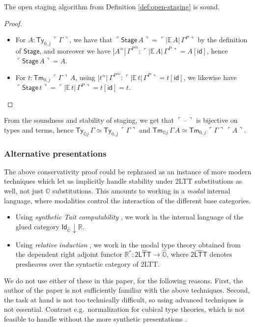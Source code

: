 \documentclass[acmsmall,review]{acmart}
\newcommand{\msf}[1]{\mathsf{#1}}
\newcommand{\mbb}[1]{\mathbb{#1}}
\newcommand{\wh}[1]{\widehat{#1}}
\newcommand{\mbbo}{\mbb{O}}
\newcommand{\Ty}{\msf{Ty}}
\newcommand{\Tm}{\msf{Tm}}
\newcommand{\id}{\msf{id}}
\newcommand{\blank}{{\mathord{\hspace{1pt}\text{--}\hspace{1pt}}}}
\newcommand{\emb}[1]{\ulcorner#1\urcorner}
\newcommand{\Stage}{\msf{Stage}}
\newcommand{\hato}{\bm\hat{\mbbo}}
\newcommand{\ev}{\mbb{E}}
\newcommand{\re}{\mbb{R}}
\theoremstyle{remark}
\newcommand{\rel}{^{\approx}}
\begin{document}
\begin{theorem}
The open staging algorithm from Definition \ref{def:open-staging} is sound.
\end{theorem}
\begin{proof}
\mbox{}
\begin{itemize}
\item For $A : \Ty_{0,j}\,\emb{\Gamma}$, we have that $\emb{\Stage\,A} =
\emb{|\ev\,A|\,\Gamma^P}$ by the definition of $\Stage$, and moreover we have
$|A\rel|\,{\Gamma^P}\rel : \emb{|\ev\,A|\,\Gamma^P} = A[\id]$, hence $\emb{\Stage\,A} = A$.

\item For $t : \Tm_{0,j}\,\emb{\Gamma}\,A$, using $|t\rel|\,{\Gamma^P}\rel : \emb{|\ev\,t|\,\Gamma^P} = t[\id]$, we likewise
  have $\emb{\Stage\,t} = \emb{|\ev\,t|\,\Gamma^P} = t[\id] = t$.
\end{itemize}
\end{proof}

\begin{corollary}\label{conservativity}
From the soundness and stability of staging, we get that $\emb{\blank}$ is
bijective on types and terms, hence $\Ty_{\mbbo j}\,\Gamma \simeq \Ty_{0,j}\,\emb{\Gamma}$ and
$\Tm_{\mbbo j}\,\Gamma\,A \simeq \Tm_{0,j}\,\emb{\Gamma}\,\emb{A}$.
\end{corollary}

\subsubsection{Alternative presentations}
The above conservativity proof could be rephrased as an instance of more modern
techniques which let us implicitly handle stability under 2LTT substitutions as
well, not just $\mbbo$ substitutions. This amounts to working in a \emph{modal}
internal language, where modalities control the interaction of the different base
categories.
\begin{itemize}
\item Using \emph{synthetic Tait computability} \cite{sterlingthesis}, we work
      in the internal language of the glued category $\msf{Id}_{\hato}\downarrow
      \re$.
\item Using \emph{relative induction} \cite{bocquet2021relative}, we work in the modal type theory
      obtained from the dependent right adjoint functor $\re^* : \wh{\msf{2LTT}} \to \hato$,
      where $\wh{\msf{2LTT}}$ denotes presheaves over the syntactic category of 2LTT.
\end{itemize}
We do not use either of these in this paper, for the following reasons. First,
the author of the paper is not sufficiently familiar with the above
techniques. Second, the task at hand is not too technically difficult, so using
advanced techniques is not essential. Contrast e.g.\ normalization for cubical
type theories, which is not feasible to handle without the more synthetic
presentations \cite{cubicalnbe}.
\end{document}
